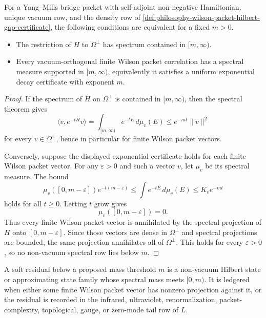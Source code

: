 \begin{theorem}
\label{thm:philosophy-wilson-decay-physical-hilbert-gap}
For a Yang--Mills bridge packet with self-adjoint non-negative Hamiltonian,
unique vacuum row, and the density row of
\autoref{def:philosophy-wilson-packet-hilbert-gap-certificate}, the following
conditions are equivalent for a fixed $m>0$.
\begin{itemize}
\item The restriction of $H$ to $\Omega^{\perp}$ has spectrum contained in
$[m,\infty)$.
\item Every vacuum-orthogonal finite Wilson packet correlation has a
spectral measure supported in $[m,\infty)$, equivalently it satisfies a
uniform exponential decay certificate with exponent $m$.
\end{itemize}
\end{theorem}
\begin{proof}
If the spectrum of $H$ on $\Omega^{\perp}$ is contained in $[m,\infty)$, then
the spectral theorem gives
$$
\langle v,e^{-tH}v\rangle
=
\int_{[m,\infty)}e^{-tE}\,d\mu_v(E)
\le e^{-mt}\|v\|^2
$$
for every $v\in\Omega^{\perp}$, hence in particular for finite Wilson packet
vectors.

Conversely, suppose the displayed exponential certificate holds for each
finite Wilson packet vector. For any $\varepsilon>0$ and such a vector $v$,
let $\mu_v$ be its spectral measure. The bound
$$
\mu_v([0,m-\varepsilon])e^{-t(m-\varepsilon)}
\le
\int e^{-tE}\,d\mu_v(E)
\le
K_v e^{-mt}
$$
holds for all $t\ge0$. Letting $t$ grow gives
$$
\mu_v([0,m-\varepsilon])=0.
$$
Thus every finite Wilson packet vector is annihilated by the spectral
projection of $H$ onto $[0,m-\varepsilon]$. Since those vectors are dense in
$\Omega^{\perp}$ and spectral projections are bounded, the same projection
annihilates all of $\Omega^{\perp}$. This holds for every $\varepsilon>0$,
so no non-vacuum spectral row lies below $m$.
\end{proof}

\begin{definition}
\label{def:philosophy-yang-mills-soft-residual-ledger}
A soft residual below a proposed mass threshold $m$ is a non-vacuum Hilbert
state or approximating state family whose spectral mass meets $[0,m)$.
It is ledgered when either some finite Wilson packet vector has nonzero
projection against it, or the residual is recorded in the infrared,
ultraviolet, renormalization, packet-complexity, topological, gauge, or
zero-mode tail row of $L$.
\end{definition}

